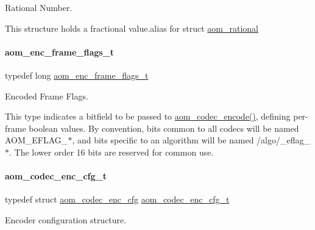 Rational Number. 

This structure holds a fractional value.\+alias for struct \hyperlink{structaom__rational}{aom\+\_\+rational} \mbox{\label{group__encoder_gacbef92200b831adb94283f84128f83de}} 
\paragraph{\texorpdfstring{aom\+\_\+enc\+\_\+frame\+\_\+flags\+\_\+t}{aom\_enc\_frame\_flags\_t}}
{\footnotesize\ttfamily typedef long \hyperlink{group__encoder_gacbef92200b831adb94283f84128f83de}{aom\+\_\+enc\+\_\+frame\+\_\+flags\+\_\+t}}



Encoded Frame Flags. 

This type indicates a bitfield to be passed to \hyperlink{group__encoder_ga6f4a777de5389771e783df7ff1f116d4}{aom\+\_\+codec\+\_\+encode()}, defining per-\/frame boolean values. By convention, bits common to all codecs will be named A\+O\+M\+\_\+\+E\+F\+L\+A\+G\+\_\+$\ast$, and bits specific to an algorithm will be named /algo/\+\_\+eflag\+\_\+$\ast$. The lower order 16 bits are reserved for common use. \mbox{\label{group__encoder_gab9627d5dcf858b7e755a5fc4a879e451}} 
\paragraph{\texorpdfstring{aom\+\_\+codec\+\_\+enc\+\_\+cfg\+\_\+t}{aom\_codec\_enc\_cfg\_t}}
{\footnotesize\ttfamily typedef struct \hyperlink{structaom__codec__enc__cfg}{aom\+\_\+codec\+\_\+enc\+\_\+cfg}  \hyperlink{group__encoder_gab9627d5dcf858b7e755a5fc4a879e451}{aom\+\_\+codec\+\_\+enc\+\_\+cfg\+\_\+t}}



Encoder configuration structure. 

